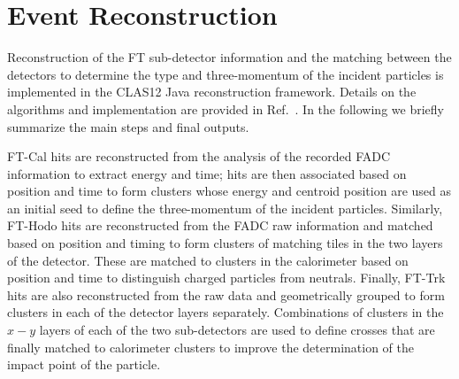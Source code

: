 \section{Event Reconstruction}

Reconstruction of the FT sub-detector information and the matching between the detectors to determine the type and
three-momentum of the incident particles is implemented in the CLAS12 Java reconstruction framework. Details on
the algorithms and implementation are provided in Ref.~\cite{reconstruction}. In the following we briefly summarize
the main steps and final outputs.

FT-Cal hits are reconstructed from the analysis of the recorded FADC information to extract energy and time;
hits are then associated based on position and time to form clusters whose energy and centroid position are used
as an initial seed to define the three-momentum of the incident particles. Similarly, FT-Hodo hits are reconstructed
from the FADC raw information and matched based on position and timing to form clusters of matching tiles in the
two layers of the detector. These are matched to clusters in the calorimeter based on position and time to distinguish
charged particles from neutrals. Finally, FT-Trk hits are also reconstructed from the raw data and geometrically
grouped to form clusters in each of the detector layers separately. Combinations of clusters in the $x-y$ layers of
each of the two sub-detectors are used to define crosses that are finally matched to calorimeter clusters to improve
the determination of the impact point of the particle.

